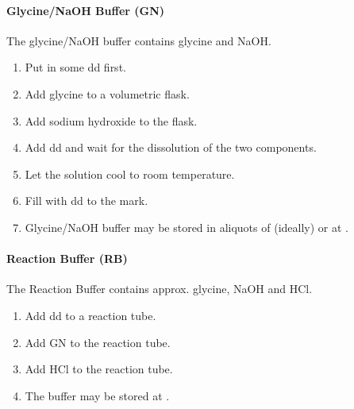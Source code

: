 \paragraph{Glycine/NaOH Buffer (GN)}
The glycine/NaOH buffer contains  glycine and  NaOH.
\begin{enumerate}
	\setcounter{enumi}{\value{sirofluor-protocol}}
	\item Put in some dd first.
	\item Add  glycine to a  volumetric flask.
	\item Add  sodium hydroxide to the flask.
	\item Add dd and wait for the dissolution of the two components.
	\item Let the solution cool to room temperature.
	\item Fill with dd to the mark.
	\item {} Glycine/NaOH buffer may be stored in aliquots of  (ideally) or  at .
	\setcounter{sirofluor-protocol}{\value{enumi}}
\end{enumerate}

\paragraph{Reaction Buffer (RB)}
The Reaction Buffer contains approx.  glycine,  NaOH and  HCl.
\begin{enumerate}
	\setcounter{enumi}{\value{sirofluor-protocol}}
	\item Add  dd to a  reaction tube.
	\item Add  GN to the reaction tube.
	\item Add   HCl to the reaction tube.
	\item The buffer may be stored at .
	\setcounter{sirofluor-protocol}{\value{enumi}}
\end{enumerate}

